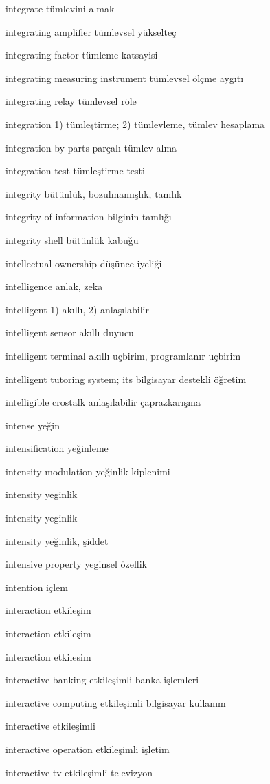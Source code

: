 \documentclass[12pt,fleqn]{article}\usepackage{../../common}
\begin{document}
integrate tümlevini almak

integrating amplifier tümlevsel yükselteç

integrating factor tümleme katsayisi

integrating measuring instrument tümlevsel ölçme aygıtı

integrating relay tümlevsel röle

integration 1) tümleştirme; 2) tümlevleme, tümlev hesaplama

integration by parts parçalı tümlev alma

integration test tümleştirme testi

integrity bütünlük, bozulmamışlık, tamlık

integrity of information bilginin tamlığı

integrity shell bütünlük kabuğu

intellectual ownership düşünce iyeliği

intelligence anlak, zeka

intelligent 1) akıllı, 2) anlaşılabilir

intelligent sensor akıllı duyucu

intelligent terminal akıllı uçbirim, programlanır uçbirim

intelligent tutoring system; its bilgisayar destekli öğretim

intelligible crostalk anlaşılabilir çaprazkarışma

intense yeğin

intensification yeğinleme

intensity modulation yeğinlik kiplenimi

intensity yeginlik

intensity yeginlik

intensity yeğinlik, şiddet

intensive property yeginsel özellik

intention içlem

interaction etkileşim

interaction etkileşim

interaction etkilesim

interactive banking etkileşimli banka işlemleri

interactive computing etkileşimli bilgisayar kullanım

interactive etkileşimli

interactive operation etkileşimli işletim

interactive tv etkileşimli televizyon
\end{document}
